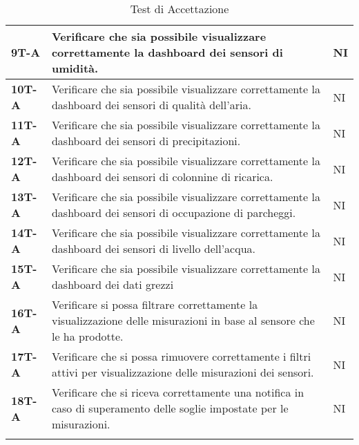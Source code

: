 \begin{longtable}{|>{\raggedright\arraybackslash}m{}|>{\raggedright\arraybackslash}m{}|>{\raggedright\arraybackslash}m{}|}
	\hline
	\textbf{9T-A}   & Verificare che sia possibile visualizzare correttamente la dashboard dei sensori di umidità.                           & NI             \\
	\hline
	\textbf{10T-A}  & Verificare che sia possibile visualizzare correttamente la dashboard dei sensori di qualità dell'aria.                 & NI             \\
	\hline
	\textbf{11T-A}  & Verificare che sia possibile visualizzare correttamente la dashboard dei sensori di precipitazioni.                    & NI             \\
	\hline
	\textbf{12T-A}  & Verificare che sia possibile visualizzare correttamente la dashboard dei sensori di colonnine di ricarica.             & NI             \\
	\hline
	\textbf{13T-A}  & Verificare che sia possibile visualizzare correttamente la dashboard dei sensori di occupazione di parcheggi.          & NI             \\
	\hline
	\textbf{14T-A}  & Verificare che sia possibile visualizzare correttamente la dashboard dei sensori di livello dell'acqua.                & NI             \\
	\hline
	\textbf{15T-A}  & Verificare che sia possibile visualizzare correttamente la dashboard dei dati grezzi                                   & NI             \\
	\hline
	\textbf{16T-A}  & Verificare si possa filtrare correttamente la visualizzazione delle misurazioni in base al sensore che le ha prodotte. & NI             \\
	\hline
	\textbf{17T-A}  & Verificare che si possa rimuovere correttamente i filtri attivi per visualizzazione delle misurazioni dei sensori.     & NI             \\
	\hline
	\textbf{18T-A}  & Verificare che si riceva correttamente una notifica in caso di superamento delle soglie impostate per le misurazioni.  & NI             \\
	\hline
	\caption{Test di Accettazione} %
	\label{table:16}
\end{longtable}
